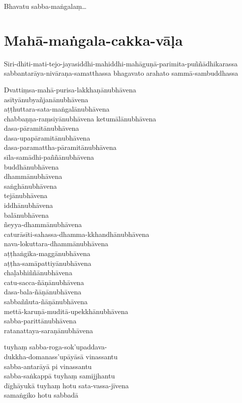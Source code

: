 Bhavatu sabba-maṅgalaṃ\ldots{}

\section{Mahā-maṅgala-cakka-vāḷa}


Siri-dhiti-mati-tejo-jayasiddhi-mahiddhi-mahāguṇā-parimita-puññādhikarassa
sabbantarāya-nivāraṇa-samatthassa bhagavato arahato sammā-sambuddhassa

Dvattiṃsa-mahā-purisa-lakkhaṇānubhāvena\\
asītyānubyañjanānubhāvena\\
aṭṭhuttara-sata-maṅgalānubhāvena\\
chabbaṇṇa-raṃsiyānubhāvena ketumālānubhāvena\\
dasa-pāramitānubhāvena\\
dasa-upapāramitānubhāvena\\
dasa-paramattha-pāramitānubhāvena\\
sīla-samādhi-paññānubhāvena\\
buddhānubhāvena\\
dhammānubhāvena\\
saṅghānubhāvena\\
tejānubhāvena\\
iddhānubhāvena\\
balānubhāvena\\
ñeyya-dhammānubhāvena\\
caturāsīti-sahassa-dhamma-kkhandhānubhāvena\\
nava-lokuttara-dhammānubhāvena\\
aṭṭhaṅgika-maggānubhāvena\\
aṭṭha-samāpattiyānubhāvena\\
chaḷabhiññānubhāvena\\
catu-sacca-ñāṇānubhāvena\\
dasa-bala-ñāṇānubhāvena\\
sabbaññuta-ñāṇānubhāvena\\
mettā-karuṇā-muditā-upekkhānubhāvena\\
sabba-parittānubhāvena\\
ratanattaya-saraṇānubhāvena

\clearpage

tuyhaṃ sabba-roga-sok'upaddava-\\ dukkha-domanass'upāyāsā vinassantu\\
sabba-antarāyā pi vinassantu\\
sabba-saṅkappā tuyhaṃ samijjhantu\\
dīghāyukā tuyhaṃ hotu sata-vassa-jīvena\\
samaṅgiko hotu sabbadā

